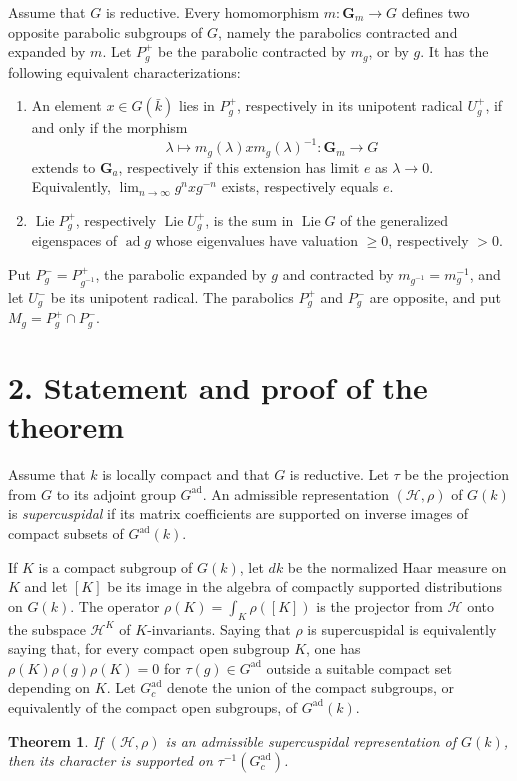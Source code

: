 \documentclass[11pt]{amsart}
\theoremstyle{plain}
\newtheorem*{theorem*}{Theorem}
\theoremstyle{definition}
\theoremstyle{remark}
\DeclareMathOperator{\Lie}{Lie}
\DeclareMathOperator{\ad}{ad}
\newcommand{\Gm}{\mathbf{G}_m}
\newcommand{\Ga}{\mathbf{G}_a}
\begin{document}
Assume that $G$ is reductive. Every homomorphism $m:\Gm\to G$ defines two opposite parabolic subgroups of $G$, namely the parabolics contracted and expanded by $m$. Let $P_g^+$ be the parabolic contracted by $m_g$, or by $g$. It has the following equivalent characterizations:
\begin{enumerate}
\item[(a)] An element $x\in G(\bar k)$ lies in $P_g^+$, respectively in its unipotent radical $U_g^+$, if and only if the morphism
\[
\lambda\mapsto m_g(\lambda)x m_g(\lambda)^{-1}:\Gm\to G
\]
extends to $\Ga$, respectively if this extension has limit $e$ as $\lambda\to0$. Equivalently, $\lim_{n\to\infty}g^n x g^{-n}$ exists, respectively equals $e$.
\item[(b)] $\Lie P_g^+$, respectively $\Lie U_g^+$, is the sum in $\Lie G$ of the generalized eigenspaces of $\ad g$ whose eigenvalues have valuation $\ge0$, respectively $>0$.
\end{enumerate}
Put $P_g^-=P_{g^{-1}}^+$, the parabolic expanded by $g$ and contracted by $m_{g^{-1}}=m_g^{-1}$, and let $U_g^-$ be its unipotent radical. The parabolics $P_g^+$ and $P_g^-$ are opposite, and put $M_g=P_g^+\cap P_g^-$.

\section*{2. Statement and proof of the theorem}
Assume that $k$ is locally compact and that $G$ is reductive. Let $\tau$ be the projection from $G$ to its adjoint group $G^{\mathrm{ad}}$. An admissible representation $(\mathscr H,\rho)$ of $G(k)$ is \emph{supercuspidal} if its matrix coefficients are supported on inverse images of compact subsets of $G^{\mathrm{ad}}(k)$.

If $K$ is a compact subgroup of $G(k)$, let $dk$ be the normalized Haar measure on $K$ and let $[K]$ be its image in the algebra of compactly supported distributions on $G(k)$. The operator $\rho(K)=\int_K\rho([K])$ is the projector from $\mathscr H$ onto the subspace $\mathscr H^K$ of $K$-invariants. Saying that $\rho$ is supercuspidal is equivalently saying that, for every compact open subgroup $K$, one has $\rho(K)\rho(g)\rho(K)=0$ for $\tau(g)\in G^{\mathrm{ad}}$ outside a suitable compact set depending on $K$. Let $G_c^{\mathrm{ad}}$ denote the union of the compact subgroups, or equivalently of the compact open subgroups, of $G^{\mathrm{ad}}(k)$.

\begin{theorem*}
If $(\mathscr H,\rho)$ is an admissible supercuspidal representation of $G(k)$, then its character is supported on $\tau^{-1}(G_c^{\mathrm{ad}})$.
\end{theorem*}
\end{document}
